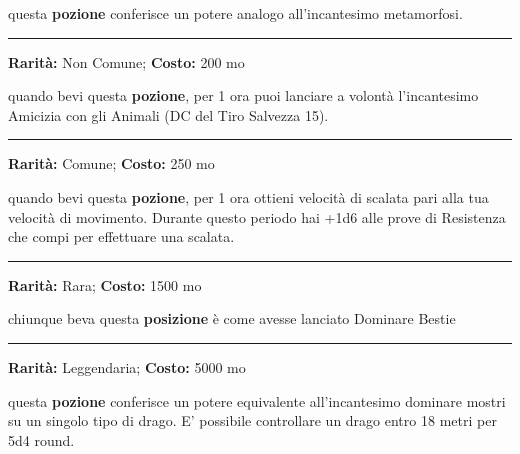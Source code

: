 \begin{multicols}{2}
questa \textbf{pozione} conferisce un potere analogo all'incantesimo metamorfosi.

\smallskip\noindent\rule{\linewidth}{2pt}  \hypertarget{PozionediAmiciziacongliAnimali}{}\medskip{}\noindent\label{PozionediAmiciziacongliAnimali}

\textbf{Rarità:} Non Comune; \textbf{Costo:} 200 mo

quando bevi questa \textbf{pozione}, per 1 ora puoi lanciare a volontà l'incantesimo Amicizia con gli Animali (DC del Tiro Salvezza 15).


\smallskip\noindent\rule{\linewidth}{2pt}  \hypertarget{PozionediArrampicata}{}\medskip{}\noindent\label{PozionediArrampicata}

\textbf{Rarità:} Comune; \textbf{Costo:} 250 mo

quando bevi questa \textbf{pozione}, per 1 ora ottieni velocità di scalata pari alla tua velocità di movimento. Durante questo periodo hai +1d6 alle prove di Resistenza che compi per effettuare una scalata.

\smallskip\noindent\rule{\linewidth}{2pt}  \hypertarget{PozionediControllodeglianimali}{}\medskip{}\noindent\label{PozionediControllodeglianimali}

\textbf{Rarità:} Rara; \textbf{Costo:} 1500 mo

chiunque beva questa \textbf{posizione} è come avesse lanciato Dominare Bestie

\smallskip\noindent\rule{\linewidth}{2pt}  \hypertarget{PozionediControllodeidraghi}{}\medskip{}\noindent\label{PozionediControllodeidraghi}

\textbf{Rarità:} Leggendaria; \textbf{Costo:} 5000 mo

questa \textbf{pozione} conferisce un potere equivalente all'incantesimo dominare mostri su un singolo tipo di drago. E' possibile controllare un drago entro 18 metri per 5d4 round.


\end{multicols}
